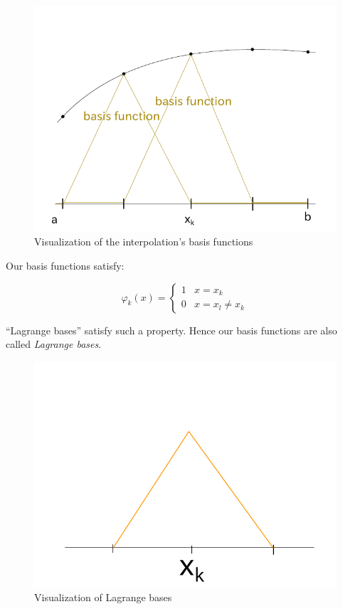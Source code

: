 \documentclass{article}
\begin{document}
\begin{figure}[t]
  \begin{center}
    \includegraphics{img/basis_function.pdf}
    \caption{Visualization of the interpolation's basis functions}
  \end{center}
\end{figure}

Our basis functions satisfy:

\[
    \varphi_k(x) = \begin{cases}
        1 & x = x_k \\
        0 & x = x_l \neq x_k
    \end{cases}
\]

\enquote{Lagrange bases} satisfy such a property. Hence our basis functions are also called \emph{Lagrange bases}.
\begin{figure}[t]
  \begin{center}
    \includegraphics{img/lagrange_basis.pdf}
    \caption{Visualization of Lagrange bases}
  \end{center}
\end{figure}
\end{document}

